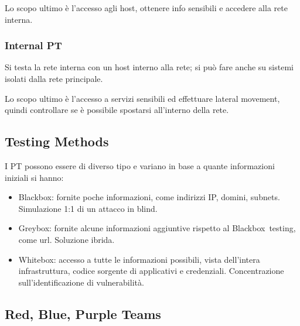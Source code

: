 \documentclass[
]{article}
\providecommand{\tightlist}{%
  \setlength{\itemsep}{0pt}\setlength{\parskip}{0pt}}
\begin{document}
{}

{Lo scopo ultimo è l'accesso agli host, ottenere info sensibili e
accedere alla rete interna.}

\subsubsection{\texorpdfstring{{Internal
PT}}{Internal PT}}\label{h.r9bmg55dosqj}

{Si testa la rete interna con un host interno alla rete; si può fare
anche su sistemi isolati dalla rete principale.}

{}

{Lo scopo ultimo è l'accesso a servizi sensibili ed effettuare }{lateral
movement}{, }{quindi controllare se è possibile spostarsi all'interno
della rete.}

\subsection{\texorpdfstring{{Testing
Methods}}{Testing Methods}}\label{h.ba92rtsqgrol}

{I PT possono essere di diverso tipo e variano in base a quante
informazioni iniziali si hanno:}

\begin{itemize}
\tightlist
\item
  {Blackbox}{: fornite poche informazioni, come indirizzi IP, domini,
  subnets. }{Simulazione 1:1 di un attacco in blind.}
\end{itemize}

{}

\begin{itemize}
\tightlist
\item
  {Greybox}{: fornite alcune informazioni aggiuntive rispetto al
  }{Blackbox}{~testing, come url. }{Soluzione ibrida.}
\end{itemize}

{}

\begin{itemize}
\tightlist
\item
  {Whitebox}{: accesso a tutte le informazioni possibili, vista
  dell'intera infrastruttura, codice sorgente di applicativi e
  credenziali. }{Concentrazione sull'identificazione di
  vulnerabilità}{.}
\end{itemize}

\subsection{\texorpdfstring{{Red, Blue, Purple
Teams}}{Red, Blue, Purple Teams}}\label{h.5b3xae5w82t1}
\end{document}
